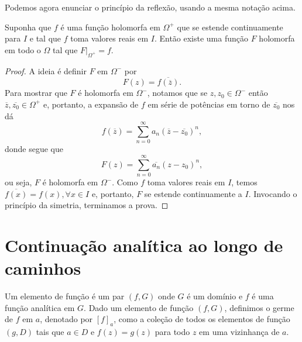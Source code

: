 Podemos agora enunciar o princípio da reflexão, usando a mesma notação acima.

\begin{teorema}
\label{teo-reflexao-schwarz}
Suponha que $f$ é uma função holomorfa em $\Omega^+$ que se estende continuamente 
para $I$ e tal que $f$ toma valores reais em $I$. Então existe uma função $F$
holomorfa em todo o $\Omega$ tal que $F\big|_{\Omega^+} = f$.
\end{teorema}

\begin{proof}
A ideia é definir $F$ em $\Omega^-$ por
\begin{equation*}
    F(z) = \overline{f(\overline{z})}.
\end{equation*}
Para mostrar que $F$ é holomorfa em $\Omega^-$, notamos que se $z, z_0\in\Omega^-$
então $\overline{z}, \overline{z_0}\in\Omega^+$ e, portanto, a expansão de $f$
em série de potências em torno de $\overline{z_0}$ nos dá
\begin{equation*}
    f(\overline{z}) = \sum_{n=0}^{\infty} a_n(\overline{z} - \overline{z_0})^n,
\end{equation*}
donde segue que
\begin{equation*}
    F(z) = \sum_{n=0}^{\infty} \overline{a_n}(z - z_0)^n,
\end{equation*}
ou seja, $F$ é holomorfa em $\Omega^-$. Como $f$ toma valores reais em $I$, temos
$\overline{f(x)} = f(x), \forall x\in I$ e, portanto, $F$ se estende continuamente
a $I$. Invocando o princípio da simetria, terminamos a prova.
\end{proof}


\section{Continuação analítica ao longo de caminhos}


\begin{definicao}
\label{def-elemento-funcao}
Um elemento de função é um par $(f, G)$ onde $G$ é um domínio e $f$
é uma função analítica em $G$. Dado um elemento de função $(f,G)$, 
definimos o germe de $f$ em $a$, denotado por $[f]_a$, 
como a coleção de todos os elementos de função $(g,D)$ tais que 
$a\in D$ e $f(z) = g(z)$ para todo $z$ em uma vizinhança de $a$.
\end{definicao}


